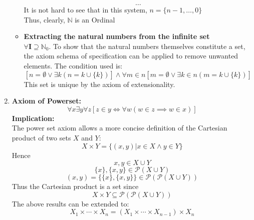 \documentclass{article}
\newcommand{\0}{{\bf{0}}}
\begin{document}
\begin{enumerate}
\begin{itemize}
        $$\dots$$
        It is not hard to see that in this system, $n=\{n-1,\dots,0\}$\\
        Thus, clearly, $\mathbb{N}$ is an Ordinal
        \item \textbf{Extracting the natural numbers from the infinite set}\\
        $\forall\mathbf{I}\supseteq{}\mathbb{N}_0$. To show that the natural numbers themselves constitute a set, the axiom schema of specification can be applied to remove unwanted elements. The condition used is:
        $$[n=\emptyset\lor\exists{}k(n=k\cup \{k\})]\land\forall m\in n[m=\emptyset\lor \exists k\in n(m=k\cup\{k\})]$$
        This set is unique by the axiom of extensionality.
    \end{itemize}
    \item \textbf{Axiom of Powerset:}
    $$\forall{}x\exists{}y\forall{}z[z\in{}y\iff\forall{}w(w\in{}z\implies{}w\in{}x)]$$
    \textbf{Implication:}\\
    The power set axiom allows a more concise definition of the Cartesian product of two sets $X$ and $Y$:$$X\times{}Y=\{(x,y)|x\in{}X\land{}y\in{}Y\}$$
    Hence
    $$x,y\in X\cup Y$$
    $$\{x\},\{x,y\}\in{\mathcal{P}}(X\cup Y)$$
    $$(x,y)=\{\{x\},\{x,y\}\}\in{\mathcal  {P}}({\mathcal  {P}}(X\cup Y))$$
    Thus the Cartesian product is a set since
    $$X\times{}Y\subseteq{\mathcal{P}}({\mathcal  {P}}(X\cup{}Y))$$
    The above results can be extended to:
    $$X_{1}\times\cdots\times{}X_{n}=(X_{1}\times\cdots\times{}X_{{n-1}})\times{}X_{n}$$
\end{enumerate}
\end{document}
